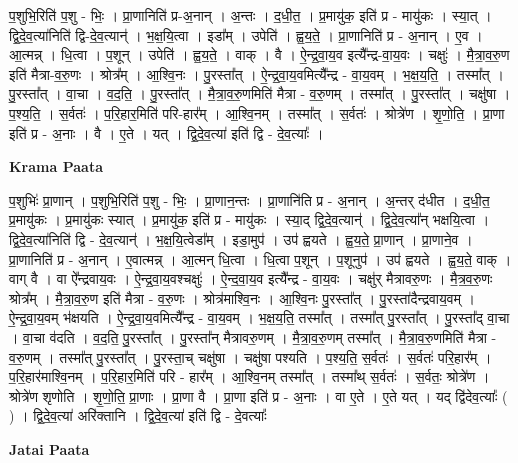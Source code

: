 \documentclass[17pt]{extarticle}
\begin{document}
प॒शुभि॒रिति॑ प॒शु - भिः॒ । प्रा॒णानिति॑ प्र-अ॒नान् । अ॒न्तः । द॒धी॒त॒ । प्र॒मायु॑क॒ इति॑ प्र - मायु॑कः । स्या॒त् । द्वि॒दे॒व॒त्या॑निति॑ द्वि-दे॒व॒त्यान्॑ । भ॒क्ष॒यि॒त्वा । इडा᳚म् । उपेति॑ । ह्व॒य॒ते॒ । प्रा॒णानिति॑ प्र - अ॒नान् । ए॒व । आ॒त्मन्न् । धि॒त्वा । प॒शून् । उपेति॑ । ह्व॒य॒ते॒ । वाक् । वै । ऐ॒न्द्र॒वा॒य॒व इत्यै᳚न्द्र-वा॒य॒वः । चक्षुः॑ । मै॒त्रा॒व॒रु॒ण इति॑ मैत्रा-व॒रु॒णः । श्रोत्र᳚म् । आ॒श्वि॒नः । पु॒रस्ता᳚त् । ऐ॒न्द्र॒वा॒य॒वमित्यै᳚न्द्र - वा॒य॒वम् । भ॒क्ष॒य॒ति॒ । तस्मा᳚त् । पु॒रस्ता᳚त् । वा॒चा । व॒द॒ति॒ । पु॒रस्ता᳚त् । मै॒त्रा॒व॒रु॒णमिति॑ मैत्रा - व॒रु॒णम् । तस्मा᳚त् । पु॒रस्ता᳚त् । चक्षु॑षा । प॒श्य॒ति॒ । स॒र्वतः॑ । प॒रि॒हार॒मिति॑ परि-हार᳚म् । आ॒श्वि॒नम् । तस्मा᳚त् । स॒र्वतः॑ । श्रोत्रे॑ण । शृ॒णो॒ति॒ । प्रा॒णा इति॑ प्र - अ॒नाः । वै । ए॒ते । यत् । द्वि॒दे॒व॒त्या॑ इति॑ द्वि - दे॒व॒त्याः᳚ ।  \newline


\textbf{Krama Paata} \newline

प॒शुभिः॑ प्रा॒णान् । प॒शुभि॒रिति॑ प॒शु - भिः॒ । प्रा॒णान॒न्तः । प्रा॒णानि॑ति प्र - अ॒नान् । अ॒न्तर् द॑धीत । द॒धी॒त॒ प्र॒मायु॑कः । प्र॒मायु॑कः स्यात् । प्र॒मायु॑क॒ इति॑ प्र - मायु॑कः । स्या॒द् द्वि॒दे॒व॒त्यान्॑ । द्वि॒दे॒व॒त्या᳚न् भक्षयि॒त्वा । द्वि॒दे॒व॒त्या॑निति॑ द्वि - दे॒व॒त्यान्॑ । भ॒क्ष॒यि॒त्वेडा᳚म् । इडा॒मुप॑ । उप॑ ह्वयते । ह्व॒य॒ते॒ प्रा॒णान् । प्रा॒णाने॒व । प्रा॒णानिति॑ प्र - अ॒नान् । ए॒वात्मन्न् । आ॒त्मन् धि॒त्वा । धि॒त्वा प॒शून् । प॒शूनुप॑ । उप॑ ह्वयते । ह्व॒य॒ते॒ वाक् । वाग् वै । वा ऐ᳚न्द्रवाय॒वः । ऐ॒न्द्र॒वा॒य॒वश्चक्षुः॑ । ऐ॒न्द॒वा॒य॒व इत्यै᳚न्द्र - वा॒य॒वः । चक्षु॑र् मैत्रावरु॒णः । मै॒त्र॒व॒रु॒णः श्रोत्र᳚म् । मै॒त्रा॒व॒रु॒ण इति॑ मैत्रा - व॒रु॒णः । श्रोत्र॑माश्वि॒नः । आ॒श्वि॒नः पु॒रस्ता᳚त् । पु॒रस्ता॑दैन्द्रवाय॒वम् । ऐ॒न्द्र॒वा॒य॒वम् भ॑क्षयति । ऐ॒न्द्र॒वा॒य॒वमित्यै᳚न्द्र - वा॒य॒वम् । भ॒क्ष॒य॒ति॒ तस्मा᳚त् । तस्मा᳚त् पु॒रस्ता᳚त् । पु॒रस्ता᳚द् वा॒चा । वा॒चा व॑दति । व॒द॒ति॒ पु॒रस्ता᳚त् । पु॒रस्ता᳚न् मैत्रावरु॒णम् । मै॒त्रा॒व॒रु॒णम् तस्मा᳚त् । मै॒त्रा॒व॒रु॒णमिति॑ मैत्रा - व॒रु॒णम् । तस्मा᳚त् पु॒रस्ता᳚त् । पु॒रस्ता॒च् चक्षु॑षा । चक्षु॑षा पश्यति । प॒श्य॒ति॒ स॒र्वतः॑ । स॒र्वतः॑ परि॒हार᳚म् । प॒रि॒हार॑माश्वि॒नम् । प॒रि॒हार॒मिति॑ परि - हार᳚म् । आ॒श्वि॒नम् तस्मा᳚त् । तस्मा᳚थ् स॒र्वतः॑ । स॒र्वतः॒ श्रोत्रे॑ण । श्रोत्रे॑ण शृणोति । शृ॒णो॒ति॒ प्रा॒णाः । प्रा॒णा वै । प्रा॒णा इति॑ प्र - अ॒नाः । वा ए॒ते । ए॒ते यत् । यद् द्वि॑देव॒त्याः᳚ ( ) । द्वि॒दे॒व॒त्या॑ अरि॑क्तानि । द्वि॒दे॒व॒त्या॑ इति॑ द्वि - दे॒वत्याः᳚ \newline

\textbf{Jatai Paata} \newline
\end{document}
